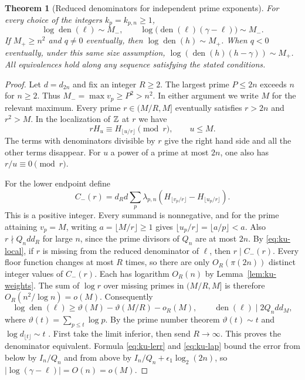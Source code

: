 \documentclass[11pt,a4paper]{article}
\newtheorem{theorem}{Theorem}[section]
\theoremstyle{definition}\newtheorem{definition}[theorem]{Definition}\newtheorem{example}[theorem]{Example}
\theoremstyle{remark}\newtheorem{remark}[theorem]{Remark}
\begin{document}
\begin{theorem}[Reduced denominators for independent prime exponents]
\label{thm:ku-den}
For every choice of the integers $k_p=k_{p,n}\ge1$,
\[
 \log\operatorname{den}(\ell)\sim M_-,\qquad
 \log\bigl(\operatorname{den}(\ell)(\gamma-\ell)\bigr)\sim M_- .
\]
If $M_+\ge n^2$ and $q\ne0$ eventually, then
$\log\operatorname{den}(h)\sim M_+$. When $q<0$ eventually, under this
same size assumption, $\log(\operatorname{den}(h)(h-\gamma))\sim M_+$.
All equivalences hold along any sequence satisfying the stated conditions.
\end{theorem}
\begin{proof}
Let $d=d_{2n}$ and fix an integer $R\ge2$. The largest prime $P\le2n$
exceeds $n$ for $n\ge2$. Thus $M_-=\max v_p\ge P^2>n^2$.
In either argument we write $M$ for the relevant maximum.
Every prime $r\in(M/R,M]$ eventually satisfies $r>2n$ and $r^2>M$.
In the localization of $\mathbb Z$ at $r$ we have
\begin{equation}
 rH_u\equiv H_{\lfloor u/r\rfloor}\pmod r,\qquad u\le M .
 \label{eq:ku-local}
\end{equation}
The terms with denominators divisible by $r$ give the right hand side
and all the other terms disappear. For $u$ a power of a prime at most
$2n$, one also has $r/u\equiv0\pmod r$.

For the lower endpoint define
\[
 C_-(r)=d_Rd\sum_p\lambda_{p,n}
       (H_{\lfloor v_p/r\rfloor}-H_{\lfloor u_p/r\rfloor}).
\]
This is a positive integer. Every summand is nonnegative, and for the
prime attaining $v_p=M$, writing $a=\lfloor M/r\rfloor\ge1$ gives
$\lfloor u_p/r\rfloor=\lfloor a/p\rfloor<a$. Also $r\nmid Q_ndd_R$
for large $n$, since the prime divisors of $Q_n$ are at most $2n$.
By \eqref{eq:ku-local}, if $r$ is missing from the reduced denominator of
$\ell$, then $r\mid C_-(r)$. Every floor function changes at most $R$ times,
so there are only $O_R(\pi(2n))$ distinct integer values of $C_-(r)$.
Each has logarithm $O_R(n)$ by Lemma~\ref{lem:ku-weights}. The sum of
$\log r$ over missing primes in $(M/R,M]$ is therefore
$O_R(n^2/\log n)=o(M)$. Consequently
\[
 \log\operatorname{den}(\ell)\ge\vartheta(M)-\vartheta(M/R)-o_R(M),
 \qquad \operatorname{den}(\ell)\mid 2Q_ndd_M,
\]
where $\vartheta(t)=\sum_{p\le t}\log p$. By the prime number theorem
$\vartheta(t)\sim t$ and $\log d_{\lfloor t\rfloor}\sim t$ \cite{PNT}.
First take the limit inferior, then send $R\to\infty$. This proves the
denominator equivalent. Formula \eqref{eq:ku-lerr} and
\eqref{eq:ku-lap} bound the error from below by $I_n/Q_n$ and from
above by $I_n/Q_n+\epsilon_1\log_2(2n)$, so
$|\log(\gamma-\ell)|=O(n)=o(M)$.


\end{proof}
\end{document}

